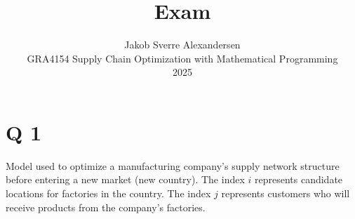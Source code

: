 \documentclass[10pt]{article}
\begin{document}
 
\title{Exam}
\author{Jakob Sverre Alexandersen\\
GRA4154 Supply Chain Optimization with Mathematical Programming\\
2025}
\maketitle

\tableofcontents
\newpage
\section{Q 1}
Model used to optimize a manufacturing company's supply network structure before entering a new market (new country). The index $i $ represents candidate locations for factories in the country. The index $j $ represents customers who will receive products from the company's factories. 
\end{document}
